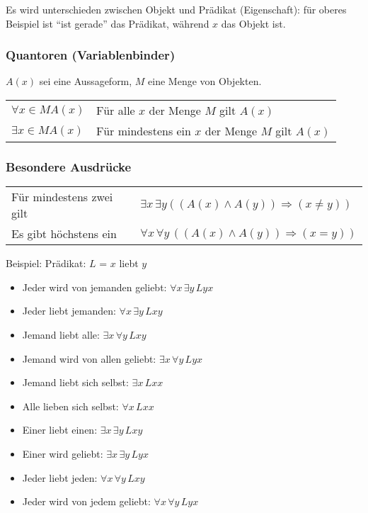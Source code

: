 Es wird unterschieden zwischen Objekt und Prädikat (Eigenschaft): für oberes Beispiel ist \enquote{ist gerade}
das Prädikat, während $x$ das Objekt ist.

\subsubsection{Quantoren (Variablenbinder)}
$A(x)$ sei eine Aussageform, $M$ eine Menge von Objekten.
\settowidth{\MyLenA}{$\forall x \in M A(x))$~~}
\begin{tabular}{@{}p{\the\MyLenA}%
				@{}p{\linewidth-\the\MyLenA}}
	$\forall x \in M A(x)$ & Für alle $x$ der Menge $M$ gilt $A(x)$\\
	$\exists x \in M A(x)$ & Für mindestens ein $x$ der Menge $M$ gilt $A(x)$\\
\end{tabular}

\subsubsection{Besondere Ausdrücke}
\begin{tabular}{ll}
	Für mindestens zwei gilt~~ & $\exists x\, \exists y ((A(x) \wedge A(y)) \Rightarrow (x \neq y))$\\
	Es gibt höchstens ein & $\forall x\, \forall y\,((A(x) \wedge A(y)) \Rightarrow (x = y))$\\
\end{tabular}
Beispiel: Prädikat: $L$ = $x$ liebt $y$
\begin{itemize}\itemsep0em
	\item Jeder wird von jemanden geliebt: $\forall x\,\exists y\,Lyx$
	\item Jeder liebt jemanden: $\forall x\, \exists y\, Lxy$
	\item Jemand liebt alle: $\exists x\, \forall y\, Lxy$
	\item Jemand wird von allen geliebt: $\exists x\, \forall y\, Lyx$
	\item Jemand liebt sich selbst: $\exists x\, Lxx$
	\item Alle lieben sich selbst: $\forall x\, Lxx$
	\item Einer liebt einen: $\exists x\, \exists y\, Lxy$
	\item Einer wird geliebt: $\exists x\, \exists y\, Lyx$
	\item Jeder liebt jeden: $\forall x\, \forall y\, Lxy$
	\item Jeder wird von jedem geliebt: $\forall x\, \forall y\, Lyx$
\end{itemize}


